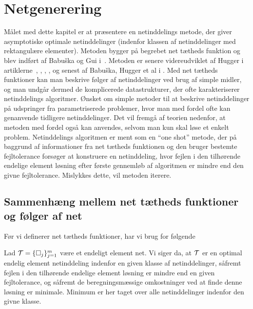 \chapter{Netgenerering} \label{netinddeling}

Målet med dette kapitel er at præsentere en netinddelings 
metode, der giver asymptotiske optimale netinddelinger 
(indenfor klassen af netinddelinger med rektangulære 
elementer). Metoden bygger på begrebet net tætheds funktion 
og blev indført af Babu\v{s}ka og Gui i~\cite{ba-gui}. Metoden er 
senere videreudviklet af Hugger i artiklerne~\cite{hugger-1}, 
\cite{hugger-3}, \cite{hugger-2}, \cite{hugger-4}, \cite{hugger-pol}
og senest af Babu\v{s}ka, Hugger et al i \cite{hugger-net}. Med net 
tætheds funktioner kan man beskrive følger af netinddelinger
ved brug af simple midler, og man undgår dermed de 
komplicerede datastrukturer, der ofte karakteriserer 
netinddelings algoritmer. Ønsket om simple metoder til at 
beskrive netinddelinger på udspringer fra parametriserede
problemer, hvor man med fordel ofte kan genanvende tidligere
netinddelinger. Det vil fremgå af teorien nedenfor, at 
metoden med fordel også kan anvendes, selvom man kun skal 
løse et enkelt problem. Netinddelings algoritmen er ment som 
en ``one shot'' metode, der på baggrund af informationer fra 
net tætheds funktionen og den bruger bestemte fejltolerance 
forsøger at konstruere en netinddeling, hvor fejlen i den
tilhørende endelige element løsning efter første gennemløb af 
algoritmen er mindre end den givne fejltolerance. Mislykkes 
dette, vil metoden iterere.

\section{Sammenhæng mellem net tætheds funk\-ti\-on\-er og følger af net} 
Før vi definerer net tætheds funktioner, har vi brug for følgende
\begin{definition}
Lad $\mathcal T=\{\Box_j\}_{j=1}^m$ være et endeligt element net. Vi
siger da, at $\mathcal T$ er en optimal endelig element netinddeling
indenfor en given klasse af netinddelinger, såfremt fejlen
i den tilhørende endelige element løsning er mindre end en 
given fejl\-to\-le\-ran\-ce, og såfremt de beregningsmæssige 
omkostninger ved at finde denne løsning er minimale. Minimum er 
her taget over alle netinddelinger indenfor den givne klasse.
\end{definition}

